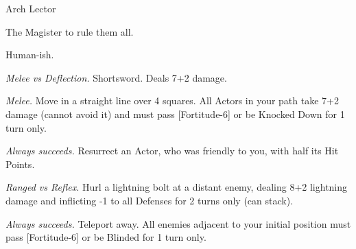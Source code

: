 \begin{monsterboxbg}{Arch Lector}

    The Magister to rule them all.
    
    \rpghline
    \stats[
        STR = \stat{14}, 
        DEX = \stat{16},
        CON = \stat{22},
        INT = \stat{30},
        WIS = \stat{22},
        CHA = \stat{24},
    ]
    \rpghline

    \basics[
    armorclass = 2,
    hitpoints  = 220,
    focus      = 15,
    defenses   = {Deflection 10, Reflex 10, Fortitude 13, Will 17}
    ]
    \rpghline

    \details[%
    skills = {Kosmics 10, Psychology 2, Lore 5, Athletics 3},
    accuracies = {Melee 6, Ranged 12},
    challenge = Nightmare Boss,
    ]
    \rpghline%
    \begin{rpg-monsteraction}
        Human-ish.
    \end{rpg-monsteraction}

    

    \begin{rpg-monsteraction}
        \textit{Melee vs Deflection.} Shortsword. Deals 7+2 damage.
    \end{rpg-monsteraction}

    \begin{rpg-monsteraction}[Lunge]
        \textit{Melee.} Move in a straight line over 4 squares. All Actors in your path take 7+2 damage (cannot avoid it) and must pass [Fortitude-6] or be Knocked Down for 1 turn only.
    \end{rpg-monsteraction}

    \begin{rpg-monsteraction}
        \textit{Always succeeds.} Resurrect an Actor, who was friendly to you, with half its Hit Points.
    \end{rpg-monsteraction}

    \begin{rpg-monsteraction}[Vanquish]
        \textit{Ranged vs Reflex.} Hurl a lightning bolt at a distant enemy, dealing 8+2 lightning damage and inflicting -1 to all Defenses for 2 turns only (can stack).
    \end{rpg-monsteraction}

    \begin{rpg-monsteraction}[Blink]
        \textit{Always succeeds.} Teleport away. All enemies adjacent to your initial position must pass [Fortitude-6] or be Blinded for 1 turn only.
    \end{rpg-monsteraction}


\end{monsterboxbg}
